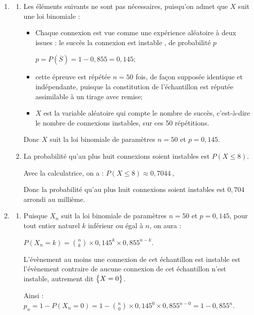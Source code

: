 \documentclass[10pt]{article}
\providecommand{\np}[2][]{{#2~#1}}
\begin{document}
\begin{enumerate}
\item 
	\begin{enumerate}
		\item Les éléments suivants ne sont pas nécessaires, puisqu'on admet que $X$ suit une loi binomiale :

\begin{itemize}
\item Chaque connexion est vue comme une expérience aléatoire à deux issues : le succès \og la connexion est instable \fg{}, de probabilité $p$

$p = P\left(\overline{S}\right) = 1-0,855 = 0,145$;
\item cette épreuve est répétée $n = 50$ fois, de façon supposée identique et indépendante, puisque la constitution de l'échantillon est réputée assimilable à un tirage avec remise;
\item $X$ est la variable aléatoire qui compte le nombre de succès, c'est-à-dire le nombre de connexions instables, sur ces 50 répétitions.
\end{itemize}

Donc $X$ suit la loi binomiale de paramètres $n = 50$ et $p = 0,145$.

		\item La probabilité qu'au plus huit connexions soient instables est $P(X \leqslant 8)$.

Avec la calculatrice, on a : $P(X \leqslant 8) \approx \np{0,7044}$, 

Donc la probabilité qu'au plus huit connexions soient instables est  $0,704$ arrondi au millième.
	\end{enumerate}

\item
	\begin{enumerate}
		\item Puisque $X_n$ suit la loi binomiale de paramètres $n=50$ et $p = 0,145$, pour tout entier naturel $k$ inférieur ou égal à $n$, on aura :

$P(X_n = k) = \displaystyle \binom{n}{k} \times 0,145^k \times 0,855^{n-k}$.

L'évènement \og au moins une connexion de cet échantillon est instable\fg{} est l'évènement contraire de \og aucune connexion de cet échantillon n'est instable\fg{}, autrement dit $\left\{X = 0\strut \right\}$.

Ainsi : $p_n = 1 - P(X_n = 0) = 1 - \displaystyle \binom{n}{0} \times 0,145^0 \times 0,855^{n-0} = 1 - 0,855^n$.


\end{enumerate}
\end{enumerate}
\end{document}
